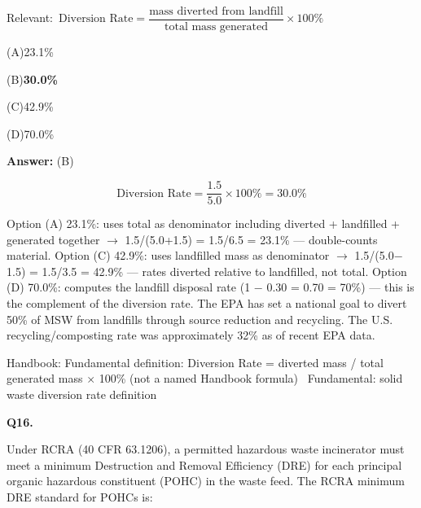 \documentclass[11pt]{article}
\newcommand{\correct}[1]{\textbf{#1}\;{\color{accent}$\checkmark$}}
\newcommand{\optline}[2]{\par\noindent\hspace{1.2em}(#1)\hspace{0.6em}#2}
\begin{document}
{\small\color{soft}Relevant:}\ $\text{Diversion Rate} = \dfrac{\text{mass diverted from landfill}}{\text{total mass generated}} \times 100\%$\par\vspace{3pt}
\optline{A}{23.1\%}
\optline{B}{\correct{30.0\%}}
\optline{C}{42.9\%}
\optline{D}{70.0\%}
\par\vspace{3pt}
\vspace{2pt}\par\noindent\colorbox{boxbg}{\parbox{\dimexpr\linewidth-2\fboxsep\relax}{%
\vspace{2pt}\textbf{Answer:} (B)\par\vspace{2pt}
{\small \[\text{Diversion Rate} = \frac{1.5}{5.0} \times 100\% = 30.0\%\]

Option (A) 23.1\%: uses total as denominator including diverted + landfilled + generated together $\rightarrow$ 1.5/(5.0+1.5) = 1.5/6.5 = 23.1\% --- double-counts material. Option (C) 42.9\%: uses landfilled mass as denominator $\rightarrow$ 1.5/(5.0$-$1.5) = 1.5/3.5 = 42.9\% --- rates diverted relative to landfilled, not total. Option (D) 70.0\%: computes the landfill disposal rate (1 $-$ 0.30 = 0.70 = 70\%) --- this is the complement of the diversion rate. The EPA has set a national goal to divert 50\% of MSW from landfills through source reduction and recycling. The U.S. recycling/composting rate was approximately 32\% as of recent EPA data.}\par\vspace{2pt}
{\footnotesize\color{soft}Handbook: Fundamental definition: Diversion Rate = diverted mass / total generated mass $\times$ 100\% (not a named Handbook formula) \textbullet\ Fundamental: solid waste diversion rate definition}\vspace{2pt}
}}
\vspace{9pt}
\filbreak
\textbf{\color{accent}Q16.}\par\vspace{2pt}
Under RCRA (40 CFR 63.1206), a permitted hazardous waste incinerator must meet a minimum Destruction and Removal Efficiency (DRE) for each principal organic hazardous constituent (POHC) in the waste feed. The RCRA minimum DRE standard for POHCs is:
\end{document}
